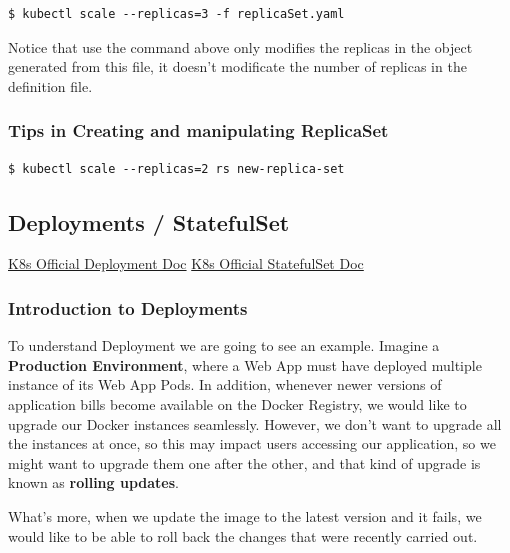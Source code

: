 \documentclass{article}
\newenvironment{blocktemplateIII}[1]{%
    \tcolorbox[beamer,%
    noparskip,breakable,
    ,colframe=Red,%
    colbacklower=LimeGreen!75!LightGreen,%
    title=#1]}%
    {\endtcolorbox}
\newenvironment{codetemplate}[1][]{%
  \mybasecolorbox[#1]
  \itshape
}{%
  \endmybasecolorbox
}
\begin{document}
\begin{blocktemplateIII}{WARNING}
\begin{codetemplate}{}
\begin{verbatim}
$ kubectl scale --replicas=3 -f replicaSet.yaml
\end{verbatim}
\end{codetemplate}
Notice that use the command above only modifies the replicas in the object generated from this file, it doesn't modificate the number of replicas in the definition file.
\end{blocktemplateIII}

\newpage
\subsubsection{Tips in Creating and manipulating ReplicaSet}
\begin{codetemplate}{}
\begin{verbatim}
$ kubectl scale --replicas=2 rs new-replica-set
\end{verbatim}
\end{codetemplate}

\subsection{Deployments / StatefulSet}

\href{https://kubernetes.io/docs/concepts/workloads/controllers/deployment/}{K8s Official Deployment Doc}
\href{https://kubernetes.io/docs/concepts/workloads/controllers/statefulset/}{K8s Official StatefulSet Doc}

\subsubsection{Introduction to Deployments}

To understand Deployment we are going to see an example. Imagine a \textbf{Production Environment}, where a Web App must have deployed multiple instance of its Web App Pods. In addition, whenever newer versions of application bills become available on the Docker Registry, we would like to upgrade our Docker instances seamlessly. However, we don't want to upgrade all the instances at once, so this may impact users accessing our application, so we might want to upgrade them one after the other, and that kind of upgrade is known as \textbf{rolling updates}.

What's more, when we update the image to the latest version and it fails, we would like to be able to roll back the changes that were recently carried out.
\end{document}
